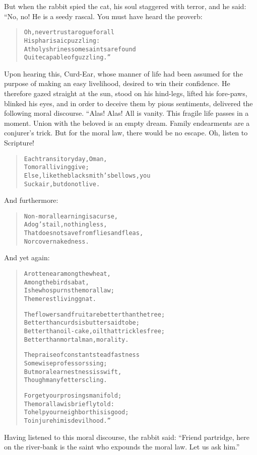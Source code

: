 \documentclass[article, twoside, 14pt]{memoir}
\renewenvironment{verbatim}{%
\begin{quote}%
\vskip -10pt%
\begin{alltt}\normalfont\large}{\end{alltt}%
\end{quote}%
\vskip -10pt
} %
\begin{document}
But when the rabbit spied the cat, his soul staggered with terror,
and he said: “No, no! He is a seedy rascal. You must have heard the
proverb:

\begin{verbatim}
Oh, never trust a rogue for all
    His pharisaic puzzling:
At holy shrines some saints are found
    Quite capable of guzzling.”
\end{verbatim}
Upon hearing this, Curd-Ear, whose manner of life had been assumed
for the purpose of making an easy livelihood, desired to win their
confidence. He therefore gazed straight at the sun, stood on his
hind-legs, lifted his fore-paws, blinked his eyes, and in order to
deceive them by pious sentiments, delivered the following moral
discourse. “Alas! Alas! All is vanity. This fragile life passes in
a moment. Union with the beloved is an empty dream. Family
endearments are a conjurer's trick. But for the moral law, there
would be no escape. Oh, listen to Scripture!

\begin{verbatim}
Each transitory day, O man,
    To moral living give;
Else, like the blacksmith's bellows, you
    Suck air, but do not live.
\end{verbatim}
And furthermore:

\begin{verbatim}
Non-moral learning is a curse,
    A dog's tail, nothing less,
That does not save from flies and fleas,
    Nor cover nakedness.
\end{verbatim}
And yet again:

\begin{verbatim}
A rotten ear among the wheat,
    Among the birds a bat,
Is he who spurns the moral law;
    The merest living gnat.

The flowers and fruit are better than the tree;
Better than curds is butter said to be;
Better than oil-cake, oil that trickles free;
Better than mortal man, morality.

The praise of constant steadfastness
    Some wise professors sing;
But moral earnestness is swift,
    Though many fetters cling.

Forget your prosings manifold;
The moral law is briefly told:
To help your neighbor{\textemdash}this is good;
To injure him is devilhood.”
\end{verbatim}
Having listened to this moral discourse, the rabbit said:
``Friend partridge, here on the river-bank is the saint who expounds the moral law. Let us ask him.''
\end{document}
